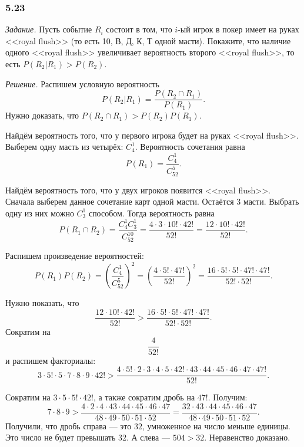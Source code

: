 \subsubsection*{5.23}

\textit{Задание.} Пусть событие $R_i$ состоит в том, что $i$-ый игрок в покер имеет на руках <<royal flush>> (то есть 10, В, Д, К, Т одной масти).
Покажите, что наличие одного <<royal flush>> увеличивает вероятность второго <<royal flush>>, то есть
$P \left( \left. R_2 \right| R_1 \right) >
P \left( R_2 \right) $.

\textit{Решение.} Распишем условную вероятность
$$P \left( \left. R_2 \right| R_1 \right) =
\frac{P \left( R_2 \cap R_1 \right) }{P \left( R_1 \right) }.$$
Нужно доказать, что $P \left( R_2 \cap R_1 \right) > P \left( R_2 \right) P \left( R_1 \right) $.

Найдём вероятность того, что у первого игрока будет на руках <<royal flush>>.
Выберем одну масть из четырёх: $C_4^1$.
Вероятность сочетания равна
$$P \left( R_1 \right) =
\frac{C_4^1}{C_{52}^5}.$$

Найдём вероятность того, что у двух игроков появится <<royal flush>>.
Сначала выберем данное сочетание карт одной масти.
Остаётся 3 масти.
Выбрать одну из них можно $C_3^1$ способом.
Тогда вероятность равна
$$P \left( R_1 \cap R_2 \right) =
\frac{C_4^1C_3^1}{C_{52}^{10}} =
\frac{4 \cdot 3 \cdot 10! \cdot 42!}{52!} =
\frac{12 \cdot 10! \cdot 42!}{52!}.$$

Распишем произведение вероятностей:
$$P \left(R_1 \right) P \left( R_2 \right) =
\left( \frac{C_4^1}{C_{52}^{5}} \right)^2 =
\left( \frac{4 \cdot 5! \cdot 47!}{52!}\right)^2 =
\frac{16 \cdot 5! \cdot 5! \cdot 47! \cdot 47!}{52! \cdot 52!}.$$

Нужно показать, что
$$\frac{12 \cdot 10! \cdot 42!}{52!} >
\frac{16 \cdot 5! \cdot 5! \cdot 47! \cdot 47!}{52! \cdot 52!}.$$
Сократим на
$$ \frac{4}{52!}$$
и распишем факториалы:
$$3 \cdot 5! \cdot 5 \cdot 7 \cdot 8 \cdot 9 \cdot 42! >
\frac{4 \cdot 5! \cdot 2 \cdot 3 \cdot 4 \cdot 5 \cdot 42! \cdot 43 \cdot 44 \cdot 45 \cdot 46 \cdot 47 \cdot 47!}{52!}.$$

Сократим на $3 \cdot 5 \cdot 5! \cdot 42!$, а также сократим дробь на $47!$.
Получим:
$$7 \cdot 8 \cdot 9 >
\frac{4 \cdot 2 \cdot 4 \cdot 43 \cdot 44 \cdot 45 \cdot 46 \cdot 47}{48 \cdot 49 \cdot 50 \cdot 51 \cdot 52} =
\frac{32 \cdot 43 \cdot 44 \cdot 45 \cdot 46 \cdot 47}{48 \cdot 49 \cdot 50 \cdot 51 \cdot 52}.$$
Получили, что дробь справа --- это $32$, умноженное на число меньше единицы.
Это число не будет превышать 32.
А слева --- $504 > 32$.
Неравенство доказано.

